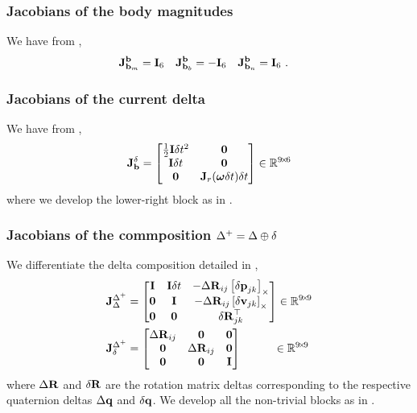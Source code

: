 \subsubsection{Jacobians of the body magnitudes}

We have from ,
%
\begin{align}
{{\bf J}^{{\bf b}}_{{\bf b}_m}}&={\bf I}_6 & {{\bf J}^{{\bf b}}_{{\bf b}_b}}&=-{\bf I}_6 & {{\bf J}^{{\bf b}}_{{\bf b}_n}}&={\bf I}_6
~.
\end{align}

\subsubsection{Jacobians of the current delta}
\label{sec:jac_data}

We have from ,
%
\begin{align}\label{equ:jacobian_current_delta}
{{\bf J}^{\delta}_{{\bf b}}} =
\begin{bmatrix}
\frac12{\bf I}\delta t^2 	& \bf0 \\
{\bf I}\delta t 			& \bf0 \\
\bf0 	          & {\bf J}_r({{\bm \omega}}\delta t)\delta t
\end{bmatrix} 
\in {\mathbb R}^{9\!\times\!6}
\end{align}
%
where we develop the lower-right block as in .





\subsubsection{Jacobians of the commposition $\Delta^+=\Delta\oplus\delta$}

We differentiate the delta composition  detailed in ,
%
\begin{subequations}
\begin{align}
{{\bf J}^{\Delta^+}_{\Delta}} &= \begin{bmatrix}
{\bf I}  & {\bf I}\delta t & - {\Delta{\bf R}}_{ij}  \left[{\delta{\bf p}}_{jk}\right]_\times  \\
\bf0  & {\bf I}    & - {\Delta{\bf R}}_{ij}  \left[{\delta{\bf v}}_{jk}\right]_\times \\
\bf0  & \bf0    &   {\delta{\bf R}}_{jk}^{\top} 
\end{bmatrix} 
\in {\mathbb R}^{9\!\times\!9}
\\
{{\bf J}^{\Delta^+}_{\delta}} &= \begin{bmatrix}
{\Delta{\bf R}}_{ij} & \bf0     & \bf0 \\
\bf0     & {\Delta{\bf R}}_{ij} & \bf0 \\
\bf0     & \bf0     & {\bf I}  
\end{bmatrix}
~~~~~~~~~\in {\mathbb R}^{9\!\times\!9}
\end{align}
\end{subequations}
%
where ${\Delta{\bf R}}$ and ${\delta{\bf R}}$ are the rotation matrix deltas corresponding to the respective quaternion deltas ${\Delta{\bf q}}$ and ${\delta{\bf q}}$. 
We develop all the non-trivial blocks as in .


